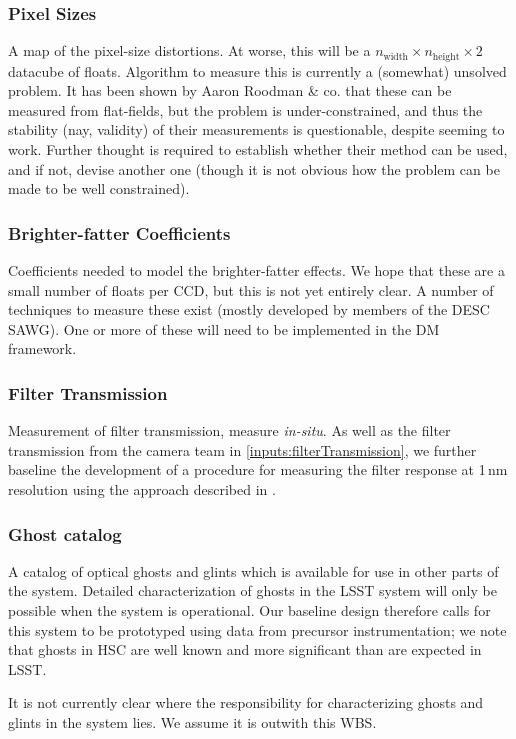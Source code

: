 \subsubsection{Pixel Sizes}\label{calibProducts:pixelSizeMap} 
A map of the pixel-size distortions.  At worse, this will be a $n_{\mbox{width}}\times n_{\mbox{height}}\times 2$ datacube of floats.
\alg Algorithm to measure this is currently a (somewhat) unsolved problem. It has been shown by Aaron Roodman \& co. that these can be measured from flat-fields, but the problem is under-constrained, and thus the stability (nay, validity) of their measurements is questionable, despite seeming to work. Further thought is required to establish whether their method can be used, and if not, devise another one (though it is not obvious how the problem can be made to be well constrained). 


\subsubsection{Brighter-fatter Coefficients}\label{calibProducts:brighterFatterCoeffs}
Coefficients needed to model the brighter-fatter effects. We hope that these are a small number of floats per CCD, but this is not yet entirely clear.
\alg A number of techniques to measure these exist (mostly developed by members of the DESC SAWG). One or more of these will need to be implemented in the DM framework.

\subsubsection{Filter Transmission}\label{calibProducts:filterTransmission}
Measurement of filter transmission, measure \emph{in-situ}. As well as the filter transmission from the camera team in \ref{inputs:filterTransmission}, we further baseline the development of a procedure for measuring the filter response at 1\,nm resolution using the approach described in \cite{Lupton15}.


\subsubsection{Ghost catalog}\label{calibProducts:GhostCatalog}
A catalog of optical ghosts and glints which is available for use in other parts of the system. Detailed characterization of ghosts in the LSST system will only be possible when the system is operational. Our baseline design therefore calls for this system to be prototyped using data from precursor instrumentation; we note that ghosts in \eg HSC are well known and more significant than are expected in LSST.
\begin{note}
It is not currently clear where the responsibility for characterizing ghosts and glints in the system lies. We assume it is outwith this WBS.
\end{note}



